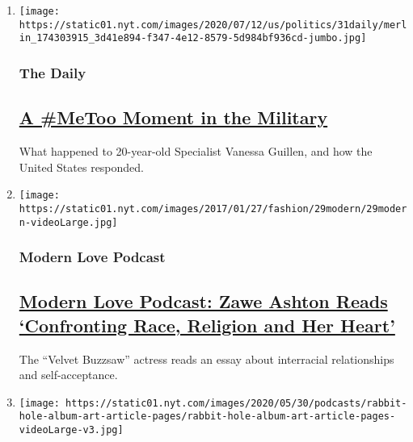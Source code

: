 \begin{enumerate}
\def\labelenumi{\arabic{enumi}.}
\item
  \texttt{[image: https://static01.nyt.com/images/2020/07/12/us/politics/31daily/merlin\_174303915\_3d41e894-f347-4e12-8579-5d984bf936cd-jumbo.jpg]}

  \hypertarget{the-daily}{%
  \subsubsection{The Daily}\label{the-daily}}

  \hypertarget{a-metoo-moment-in-the-military}{%
  \subsection{\texorpdfstring{\href{/2020/07/31/podcasts/the-daily/vanessa-guillen-military-metoo.html}{A
  \#MeToo Moment in the
  Military}}{A \#MeToo Moment in the Military}}\label{a-metoo-moment-in-the-military}}

  What happened to 20-year-old Specialist Vanessa Guillen, and how the
  United States responded.
\item
  \texttt{[image: https://static01.nyt.com/images/2017/01/27/fashion/29modern/29modern-videoLarge.jpg]}

  \hypertarget{modern-love-podcast}{%
  \subsubsection{Modern Love Podcast}\label{modern-love-podcast}}

  \hypertarget{modern-love-podcast-zawe-ashton-reads-confronting-race-religion-and-her-heart}{%
  \subsection{\texorpdfstring{\href{/2020/06/24/style/modern-love-podcast-zawe-ashton.html}{Modern
  Love Podcast: Zawe Ashton Reads `Confronting Race, Religion and Her
  Heart'}}{Modern Love Podcast: Zawe Ashton Reads `Confronting Race, Religion and Her Heart'}}\label{modern-love-podcast-zawe-ashton-reads-confronting-race-religion-and-her-heart}}

  The ``Velvet Buzzsaw'' actress reads an essay about interracial
  relationships and self-acceptance.
\item
  \texttt{[image: https://static01.nyt.com/images/2020/05/30/podcasts/rabbit-hole-album-art-article-pages/rabbit-hole-album-art-article-pages-videoLarge-v3.jpg]}


\end{enumerate}
